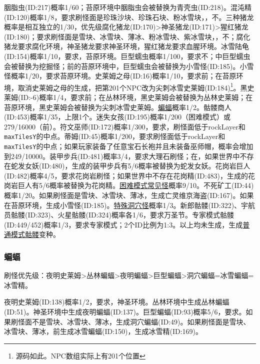 胭脂虫(ID:217)概率1/60；苔原环境中胭脂虫会被替换为青壳虫(ID:218)。混沌精(ID:120)概率1/8，要求刷怪面是珍珠沙块、珍珠石块、粉冰雪块，，不。三种猪龙概率是相互独立的1/30，优先级腐化猪龙(ID:170)>神圣猪龙(ID:171)>猩红猪龙(ID:180)；要求刷怪面是雪块、冰雪块、薄冰、粉冰雪块、紫冰雪块，，不；腐化猪龙要求腐化环境，神圣猪龙要求神圣环境，猩红猪龙要求血腥环境。冰雪陆龟(ID:154)概率1/10，要求，苔原环境。巨型蠕虫概率1/100，要求不；中巨型蠕虫会被替换为挖掘怪；前的苔原环境中，巨型蠕虫会被替换为小雪怪(ID:185)。小雪怪概率1/20，要求苔原环境。史莱姆之母(ID:16)概率1/10，要求前；在苔原环境，取消史莱姆之母的生成，把第201个NPC改为尖刺冰雪史莱姆(ID:184)\footnote{源码如此。NPC数组实际上有201个位置}。黑史莱姆(ID:-6)概率1/4，要求前；在丛林环境，黑史莱姆会被替换为丛林史莱姆；在苔原环境，黑史莱姆会被替换为尖刺冰雪史莱姆。\hyperref[app18]{蝙蝠}概率1/2。骷髅商人(ID:453)概率1/35，上限1个。迷失女孩(ID:195)概率1/200（困难模式）或279/16000（前）。符文巫师(ID:172)概率1/300，要求，刷怪面低于rockLayer和\lstinline{maxTilesY}的中点。蒂姆(ID:45)概率1/200，要求刷怪面低于rockLayer和\lstinline{maxTilesY}的中点；如果玩家装备了任意宝石长袍并且未装备巫师帽，概率会增加到249/10000。装甲步兵(ID:481)概率3/4，要求大理石刷怪；在，如果世界中不存在蛇发女妖(ID:480)，生成的装甲步兵有5/6概率被替换为蛇发女妖。花岗岩巨人(ID:482)概率4/5，要求花岗岩刷怪；如果世界中不存在花岗精(ID:483)，生成的花岗岩巨人有5/6概率被替换为花岗精。\hyperref[app19]{困难模式常见怪}概率9/10。不死矿工(ID:44)概率1/20。如果刷怪面是雪块、冰雪块、薄冰，生成亡灵维京海盗(ID:167)。如果在苔原环境，生成小雪怪(ID:185)。\hyperref[app20]{特殊洞穴怪}概率1/3。新郎骷髅(ID:322)、宇航员骷髅(ID:323)、火星骷髅(ID:324)概率各1/6，要求万圣节。专家模式骷髅(ID:449/452)概率1/3，要求专家模式；2个ID比例为1:3。以上均未生成，生成\hyperref[app21]{普通模式骷髅}变种。

\subsubsection{蝙蝠}\label{app18}
刷怪优先级：夜明史莱姆>丛林蝙蝠>夜明蝙蝠>巨型蝙蝠>洞穴蝙蝠=冰雪蝙蝠=冰雪精。

夜明史莱姆(ID:138)概率1/2，要求，神圣环境。丛林环境中生成丛林蝙蝠(ID:51)。神圣环境中生成夜明蝙蝠(ID:137)。巨型蝙蝠(ID:93)概率5/6，要求。如果刷怪面不是雪块、冰雪块、薄冰，生成洞穴蝙蝠(ID:49)。如果刷怪面是雪块、冰雪块、薄冰，前生成冰雪蝙蝠(ID:150)，生成冰雪精(ID:169)。

